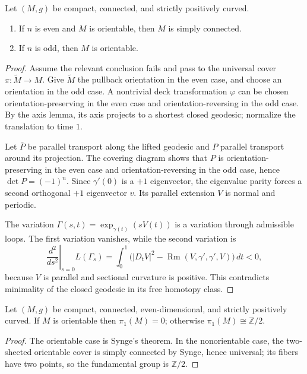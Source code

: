 \begin{theorem}[Synge]
\label{thm:synge-positive-sectional}
Let $(M,g)$ be compact, connected, and strictly positively curved.
\begin{enumerate}
\item[(a)] If $n$ is even and $M$ is orientable, then $M$ is simply connected.
\item[(b)] If $n$ is odd, then $M$ is orientable.
\end{enumerate}
\end{theorem}

\begin{proof}
\sketch
Assume the relevant conclusion fails and pass to the universal cover
$\pi:\widetilde M\to M$.  Give $\widetilde M$ the pullback orientation in
the even case, and choose an orientation in the odd case.  A nontrivial deck
transformation $\varphi$ can be chosen orientation-preserving in the even case
and orientation-reversing in the odd case.  By the axis lemma, its axis projects
to a shortest closed geodesic; normalize the translation to time $1$.

Let $\bar P$ be parallel transport along the lifted geodesic and $P$ parallel
transport around its projection.  The covering diagram shows that $P$ is
orientation-preserving in the even case and orientation-reversing in the odd
case, hence $\det P=(-1)^n$.  Since $\gamma'(0)$ is a $+1$ eigenvector, the
eigenvalue parity forces a second orthogonal $+1$ eigenvector $v$.  Its parallel
extension $V$ is normal and periodic.

The variation $\Gamma(s,t)=\exp_{\gamma(t)}(sV(t))$ is a variation through
admissible loops.  The first variation vanishes, while the second variation is
\[
\left.\frac{d^2}{ds^2}\right|_{s=0}L(\Gamma_s)
=\int_0^1\bigl(|D_tV|^2-\operatorname{Rm}(V,\gamma',\gamma',V)\bigr)\,dt<0,
\]
because $V$ is parallel and sectional curvature is positive.  This contradicts
minimality of the closed geodesic in its free homotopy class.
\end{proof}

\begin{corollary}
\label{cor:fundamental-groups-even-dimension}
Let $(M,g)$ be compact, connected, even-dimensional, and strictly positively
curved.  If $M$ is orientable then $\pi_1(M)=0$; otherwise
$\pi_1(M)\cong\mathbb Z/2$.
\end{corollary}

\begin{proof}
\sketch
The orientable case is Synge's theorem.  In the nonorientable case, the
two-sheeted orientable cover is simply connected by Synge, hence universal;
its fibers have two points, so the fundamental group is $\mathbb Z/2$.
\end{proof}
